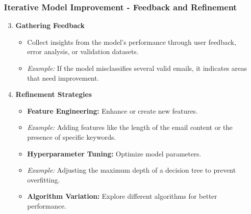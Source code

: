 \documentclass[aspectratio=169]{beamer}
\begin{document}
\begin{frame}[fragile]
    \frametitle{Iterative Model Improvement - Feedback and Refinement}
    \begin{enumerate}
        \setcounter{enumi}{2}
        \item \textbf{Gathering Feedback}
        \begin{itemize}
            \item Collect insights from the model’s performance through user feedback, error analysis, or validation datasets.
            \item \textit{Example:} If the model misclassifies several valid emails, it indicates areas that need improvement.
        \end{itemize}

        \item \textbf{Refinement Strategies}
        \begin{itemize}
            \item \textbf{Feature Engineering:} Enhance or create new features. 
            \item \textit{Example:} Adding features like the length of the email content or the presence of specific keywords.
            \item \textbf{Hyperparameter Tuning:} Optimize model parameters.
            \item \textit{Example:} Adjusting the maximum depth of a decision tree to prevent overfitting.
            \item \textbf{Algorithm Variation:} Explore different algorithms for better performance.
        \end{itemize}
    \end{enumerate}
\end{frame}
\end{document}
